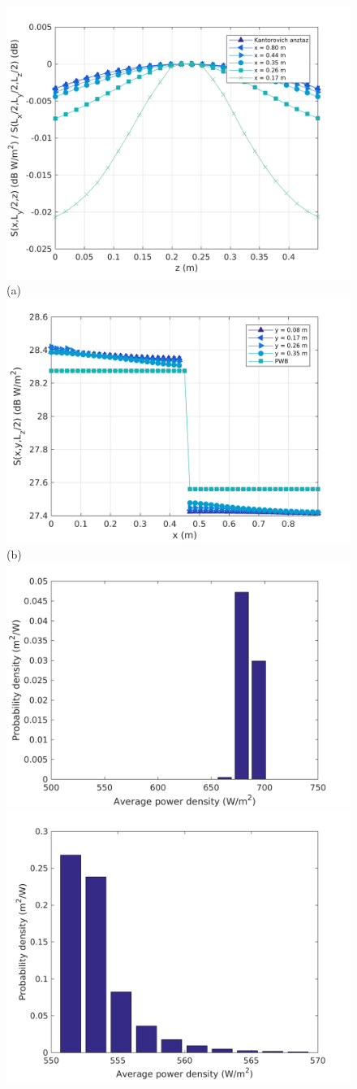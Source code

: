 \documentclass[a4paper]{article}
\numberwithin{equation}{section}
\begin{document}
\begin{figure}[hp]
\begin{center}
\includegraphics[width=0.6\linewidth]{figures/DDM-EEBC_3D_DU_PowerDensityProfileZ}\\
{\footnotesize (a)}\\
\vspace{2mm}
\includegraphics[width=0.6\linewidth]{figures/DDM-EEBC_3D_DU_PowerDensityProfileX}\\
{\footnotesize (b)}\\
\vspace{2mm}
\includegraphics[width=0.45\linewidth]{figures/DDM-EEBC_3D_DU_PowerDensityPDF1}
\includegraphics[width=0.45\linewidth]{figures/DDM-EEBC_3D_DU_PowerDensityPDF2}

\end{center}
\end{figure}
\end{document}
